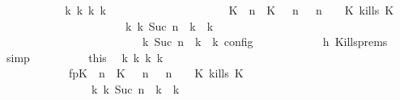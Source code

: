 \begin{isabellebody}
\ \ \ \ \ \ \ \ \isamarkupfalse%
\ \isamarkupfalse%
\ {\isacartoucheopen}{\isasymexists}{\isasymGamma}\isactrlsub k\ {\isasymPsi}\isactrlsub k\ {\isasymPhi}\isactrlsub k\ k{\isachardot}\ {\isacharparenleft}\isanewline
\ \ \ \ \ \ \ \ \ \ \ \ \ \ \ \ \ \ \ \ {\isacharparenleft}{\isacharparenleft}{\isacharparenleft}K\ {\isasymUp}\ n{\isacharparenright}\ {\isacharhash}\ {\isacharparenleft}K\ {\isasymnot}{\isasymUp}\ {\isasymge}\ n{\isacharparenright}\ {\isacharhash}\ {\isasymGamma}{\isacharparenright}{\isacharcomma}\ n\ {\isasymturnstile}\ {\isasymPsi}\ {\isasymtriangleright}\ {\isacharparenleft}{\isacharparenleft}K\ kills\ K\ {\isacharhash}\ {\isasymPhi}{\isacharparenright}{\isacharparenright}\isanewline
\ \ \ \ \ \ \ \ \ \ \ \ \ \ \ \ \ \ \ \ \ \ {\isasymhookrightarrow}\isactrlbsup k\isactrlesup \ {\isacharparenleft}{\isasymGamma}\isactrlsub k{\isacharcomma}\ Suc\ n\ {\isasymturnstile}\ {\isasymPsi}\isactrlsub k\ {\isasymtriangleright}\ {\isasymPhi}\isactrlsub k{\isacharparenright}\isanewline
\ \ \ \ \ \ \ \ \ \ \ \ \ \ \ \ \ \ \ \ {\isacharparenright}\ {\isasymand}\ {\isasymrho}\ {\isasymin}\ {\isasymlbrakk}\ {\isasymGamma}\isactrlsub k{\isacharcomma}\ Suc\ n\ {\isasymturnstile}\ {\isasymPsi}\isactrlsub k\ {\isasymtriangleright}\ {\isasymPhi}\isactrlsub k\ {\isasymrbrakk}\isactrlsub c\isactrlsub o\isactrlsub n\isactrlsub f\isactrlsub i\isactrlsub g{\isacartoucheclose}\isanewline
\ \ \ \ \ \ \ \ \ \ \isamarkupfalse%
\ h{}\ Kills{\isachardot}prems\ \isamarkupfalse%
\ simp\isanewline
\ \ \ \ \ \ \ \ \isamarkupfalse%
\ this\ \isamarkupfalse%
\ {\isasymGamma}\isactrlsub k\ {\isasymPsi}\isactrlsub k\ {\isasymPhi}\isactrlsub k\ k\ \isanewline
\ \ \ \ \ \ \ \ \ \ \ \ fp{\isacharcolon}{\isacartoucheopen}{\isacharparenleft}{\isacharparenleft}{\isacharparenleft}K\ {\isasymUp}\ n{\isacharparenright}\ {\isacharhash}\ {\isacharparenleft}K\ {\isasymnot}{\isasymUp}\ {\isasymge}\ n{\isacharparenright}\ {\isacharhash}\ {\isasymGamma}{\isacharparenright}{\isacharcomma}\ n\ {\isasymturnstile}\ {\isasymPsi}\ {\isasymtriangleright}\ {\isacharparenleft}{\isacharparenleft}K\ kills\ K\ {\isacharhash}\ {\isasymPhi}{\isacharparenright}{\isacharparenright}\isanewline
\ \ \ \ \ \ \ \ \ \ \ \ \ \ \ \ {\isasymhookrightarrow}\isactrlbsup k\isactrlesup \ {\isacharparenleft}{\isasymGamma}\isactrlsub k{\isacharcomma}\ Suc\ n\ {\isasymturnstile}\ {\isasymPsi}\isactrlsub k\ {\isasymtriangleright}\ {\isasymPhi}\isactrlsub k{\isacharparenright}{\isacartoucheclose}\isanewline

\end{isabellebody}

